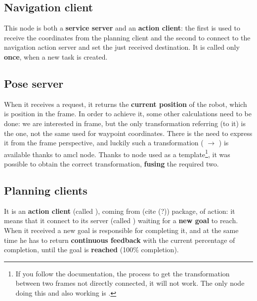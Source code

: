 \subsection{Navigation client}

This node is both a \textbf{service server} and an \textbf{action client}: the first is used to receive the coordinates from the planning client and the second to connect to the navigation action server and set the just received destination. It is called only \textbf{once}, when a new task is created.

\subsection{Pose server}
\label{sub:pose}

When it receives a request, it returns the \textbf{current position} of the robot, which is  position in the  frame. In order to achieve it, some other calculations need to be done: we are interested in  frame, but the only transformation referring (to it) is the  one, not the same used for waypoint coordinates. There is the need to express it from the  frame perspective, and luckily such a transformation ( $\rightarrow$ ) is available thanks to \acrshort{amcl} node. 
Thanks to  node \cite{tfexample} used as a template\footnote{If you follow the documentation, the process to get the transformation between two frames not directly connected, it will not work. The only node doing this and also working is .}, it was possible to obtain the correct transformation, \textbf{fusing} the required two.

\subsection{Planning clients}


It is an \textbf{action client} (called ), coming from  (cite (?)) package, of  action: it means that it connect to its server (called ) waiting for a \textbf{new goal} to reach. When it received a new goal is responsible for completing it, and at the same time he has to return \textbf{continuous feedback
} with the current percentage of completion, until the goal is \textbf{reached} (100\% completion).

